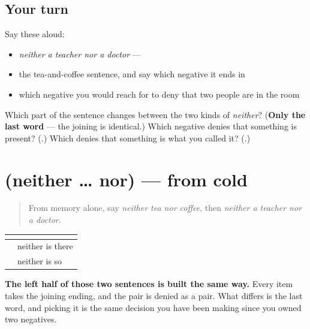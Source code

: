 \subsection*{Your turn}
Say these aloud:

\begin{itemize}
\raggedright
  \item \emph{neither a teacher nor a doctor} — \textbf{  }
  \item the tea-and-coffee sentence, and say which negative it ends in
  \item which negative you would reach for to deny that two people are in the room
\end{itemize}

\begin{tcolorbox}[breakable,colback=teal!4,colframe=teal!35!black,title={Before you move on}]
Which part of the sentence changes between the two kinds of \emph{neither}? (\textbf{Only the last word} — the joining is identical.) Which negative denies that something is present? (\textbf{}.) Which denies that something is what you called it? (\textbf{}.)
\end{tcolorbox}
\section[(neither … nor)]{(neither … nor) — from cold}

\label{lesson:ML-R109-neither-recall}



\begin{quote}
From memory alone, say \emph{neither tea nor coffee}, then \emph{neither a teacher nor a doctor}.
\end{quote}

\begin{grammarlens}[title={Grammar Lens: one joining, two endings}]
\noindent
\begin{tabularx}{\linewidth}{@{}>{\raggedright\arraybackslash}X>{\raggedright\arraybackslash}X@{}}
\toprule
\textbf{} & \textbf{} \\
\midrule
\textbf{\ml{ചായയും} \ml{കാപ്പിയും} \ml{ഇല്ല}} & neither is there \\
\textbf{\ml{അധ്യാപകനും} \ml{വൈദ്യനും} \ml{അല്ല}} & neither is so \\
\bottomrule
\end{tabularx}

\textbf{The left half of those two sentences is built the same way.} Every item takes the joining ending, and the pair is denied as a pair. What differs is the last word, and picking it is the same decision you have been making since you owned two negatives.
\end{grammarlens}

